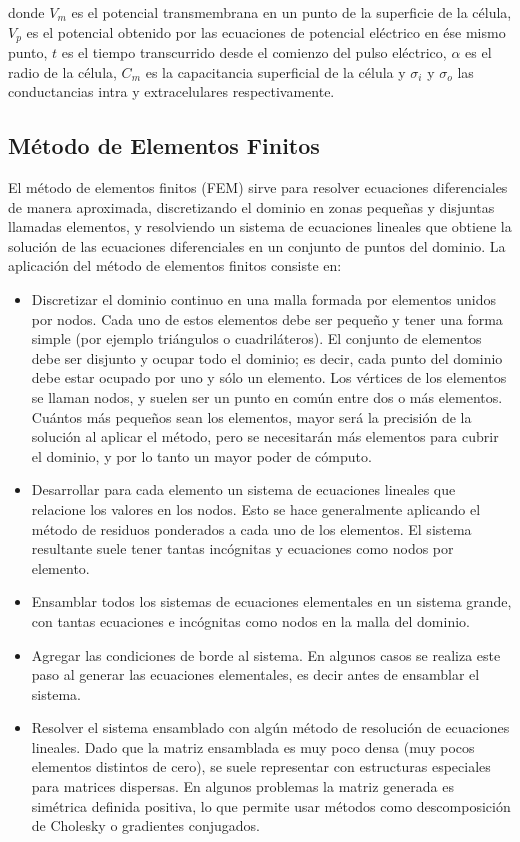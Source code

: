\documentclass[a4paper,10pt]{article}
\begin{document}
donde $V_m$ es el potencial transmembrana en un punto de la superficie de la célula, $V_p$ es el potencial obtenido por las ecuaciones de potencial eléctrico en ése mismo punto, $t$ es el tiempo transcurrido desde el comienzo del pulso eléctrico, $\alpha$ es el radio de la célula, $C_m$ es la capacitancia superficial de la célula y $\sigma_i$ y $\sigma_o$ las conductancias intra y extracelulares respectivamente.\\

\subsection{Método de Elementos Finitos}
El método de elementos finitos (FEM) sirve para resolver ecuaciones diferenciales de manera aproximada, discretizando el dominio en zonas pequeñas y disjuntas llamadas elementos, y resolviendo un sistema de ecuaciones lineales que obtiene la solución de las ecuaciones diferenciales en un conjunto de puntos del dominio. La aplicación del método de elementos finitos consiste en:

\begin{itemize}
	\item Discretizar el dominio continuo en una malla formada por elementos unidos por nodos. Cada uno de estos elementos debe ser pequeño y tener una forma simple (por ejemplo triángulos o cuadriláteros). El conjunto de elementos debe ser disjunto y ocupar todo el dominio; es decir, cada punto del dominio debe estar ocupado por uno y sólo un elemento. Los vértices de los elementos se llaman nodos, y suelen ser un punto en común entre dos o más elementos. Cuántos más pequeños sean los elementos, mayor será la precisión de la solución al aplicar el método, pero se necesitarán más elementos para cubrir el dominio, y por lo tanto un mayor poder de cómputo. 
	
	\item Desarrollar para cada elemento un sistema de ecuaciones lineales que relacione los valores en los nodos. Esto se hace generalmente aplicando el método de residuos ponderados a cada uno de los elementos. El sistema resultante suele tener tantas incógnitas y ecuaciones como nodos por elemento.
		
	\item Ensamblar todos los sistemas de ecuaciones elementales en un sistema grande, con tantas ecuaciones e incógnitas como nodos en la malla del dominio. 
	
	\item Agregar las condiciones de borde al sistema. En algunos casos se realiza este paso al generar las ecuaciones elementales, es decir antes de ensamblar el sistema.
	
	\item Resolver el sistema ensamblado con algún método de resolución de ecuaciones lineales. Dado que la matriz ensamblada es muy poco densa (muy pocos elementos distintos de cero), se suele representar con estructuras especiales para matrices dispersas. En algunos problemas la matriz generada es simétrica definida positiva, lo que permite usar métodos como descomposición de Cholesky o gradientes conjugados.
\end{itemize}
\end{document}
